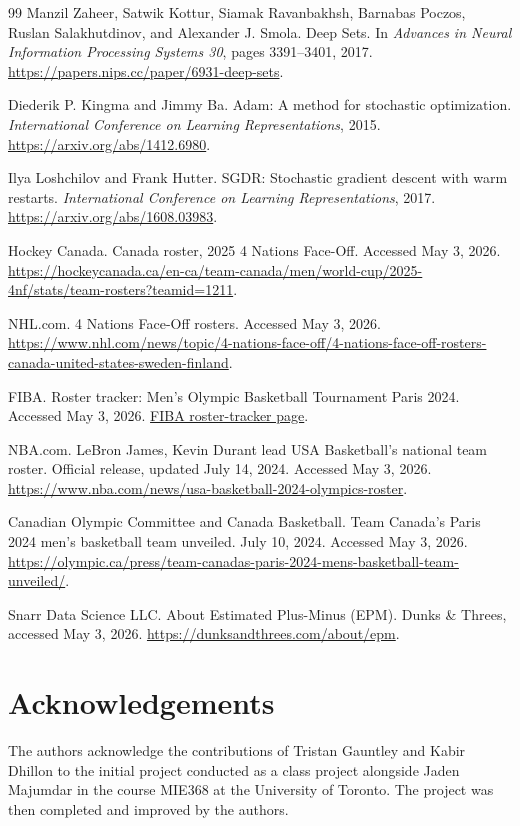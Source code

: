 \documentclass[11pt,letterpaper]{article}
\begin{document}
\begin{thebibliography}{99}
Manzil Zaheer, Satwik Kottur, Siamak Ravanbakhsh, Barnabas Poczos,
Ruslan Salakhutdinov, and Alexander J. Smola.
Deep Sets.
In \emph{Advances in Neural Information Processing Systems 30},
pages 3391--3401, 2017.
\url{https://papers.nips.cc/paper/6931-deep-sets}.

Diederik P. Kingma and Jimmy Ba.
Adam: A method for stochastic optimization.
\emph{International Conference on Learning Representations}, 2015.
\url{https://arxiv.org/abs/1412.6980}.

Ilya Loshchilov and Frank Hutter.
SGDR: Stochastic gradient descent with warm restarts.
\emph{International Conference on Learning Representations}, 2017.
\url{https://arxiv.org/abs/1608.03983}.

Hockey Canada.
Canada roster, 2025 4 Nations Face-Off.
Accessed May 3, 2026.
\url{https://hockeycanada.ca/en-ca/team-canada/men/world-cup/2025-4nf/stats/team-rosters?teamid=1211}.

NHL.com.
4 Nations Face-Off rosters.
Accessed May 3, 2026.
\url{https://www.nhl.com/news/topic/4-nations-face-off/4-nations-face-off-rosters-canada-united-states-sweden-finland}.

FIBA.
Roster tracker: Men's Olympic Basketball Tournament Paris 2024.
Accessed May 3, 2026.
\href{https://www.fiba.basketball/en/news/olympics-men-2024-news-roster-tracker-men-s-olympic-basketball-tournament-paris-2024}{FIBA roster-tracker page}.

NBA.com.
LeBron James, Kevin Durant lead USA Basketball's national team roster.
Official release, updated July 14, 2024. Accessed May 3, 2026.
\url{https://www.nba.com/news/usa-basketball-2024-olympics-roster}.

Canadian Olympic Committee and Canada Basketball.
Team Canada's Paris 2024 men's basketball team unveiled.
July 10, 2024. Accessed May 3, 2026.
\url{https://olympic.ca/press/team-canadas-paris-2024-mens-basketball-team-unveiled/}.

Snarr Data Science LLC.
About Estimated Plus-Minus (EPM).
Dunks \& Threes, accessed May 3, 2026.
\url{https://dunksandthrees.com/about/epm}.

\end{thebibliography}

\section*{Acknowledgements}

The authors acknowledge the contributions of Tristan Gauntley and Kabir Dhillon to the initial project conducted as a class project alongside Jaden Majumdar in the course MIE368 at the University of Toronto. The project was then completed and improved by the authors.
\end{document}

